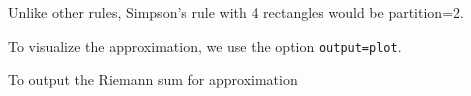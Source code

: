 Unlike other rules, Simpson's rule with 4 rectangles would be partition=2.

To visualize the approximation, we use the option \texttt{output=plot}.

\begin{maplegroup}
\begin{mapleinput}
\end{mapleinput}
\mapleresult
{}
\end{maplegroup}
\begin{maplegroup}
\begin{Maple Normal}{
To output the Riemann sum for approximation}\end{Maple Normal}

\end{maplegroup}
\begin{maplegroup}
\begin{mapleinput}
\end{mapleinput}
\mapleresult
\begin{maplelatex}
\end{maplelatex}
\end{maplegroup}